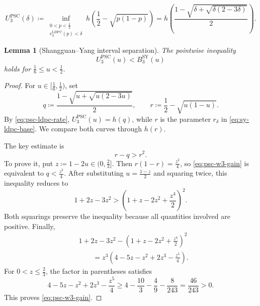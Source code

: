 \documentclass[10pt,a4paper]{amsart}
\newtheorem{lemma}{Lemma}
\newcommand{\PSC}{\mathrm{PSC}}
\renewcommand{\geq}{\geqslant}
\renewcommand{\leq}{\leqslant}
\begin{document}
\begin{equation}
\label{eq:psc-ldpc-rate}
U_3^{\PSC}(\delta)
\coloneqq
\inf_{\substack{0 < p < \frac{1}{2}\\ e_3^{\mathrm{LDPC}}(p) < \delta}}
h\left(\frac{1}{2}-\sqrt{p(1-p)}\right)
=
h\left(\frac{1-\sqrt{\delta+\sqrt{\delta(2-3\delta)}}}{2}\right).
\end{equation}

\begin{lemma}[Shangguan--Yang interval separation]
\label{lem:psc-sy-interval}
The pointwise inequality
\begin{equation*}
U_3^{\PSC}(u)
< B_3^{\mathrm{SY}}(u)
\end{equation*}
holds for $\frac{1}{6} \leq u < \frac{1}{2}$.
\end{lemma}

\begin{proof}
For $u \in [\frac{1}{6},\frac{1}{2})$, set
\begin{equation*}
q
\coloneqq
\frac{1-\sqrt{u+\sqrt{u(2-3u)}}}{2},
\qquad
r
\coloneqq
\frac{1}{2}-\sqrt{u(1-u)}.
\end{equation*}
By \eqref{eq:psc-ldpc-rate}, $U_3^{\PSC}(u) = h(q)$, while $r$ is the parameter $r_\delta$ in \eqref{eq:sy-ldpc-base}. We compare both curves through $h(r)$.

The key estimate is
\begin{equation}
\label{eq:psc-w3-gain}
r-q > r^2.
\end{equation}
To prove it, put $z \coloneqq 1-2u \in (0,\frac{2}{3}]$. Then $r(1-r) = \frac{z^2}{4}$, so \eqref{eq:psc-w3-gain} is equivalent to $q < \frac{z^2}{4}$. After substituting $u = \frac{1-z}{2}$ and squaring twice, this inequality reduces to
\begin{equation*}
1+2z-3z^2
>
\left(1+z-2z^2+\frac{z^4}{2}\right)^2.
\end{equation*}
Both squarings preserve the inequality because all quantities involved are positive. Finally,
\begin{align*}
&1+2z-3z^2
-\left(1+z-2z^2+\frac{z^4}{2}\right)^2\\
&\qquad
=z^3\left(4-5z-z^2+2z^3-\frac{z^5}{4}\right).
\end{align*}
For $0 < z \leq \frac{2}{3}$, the factor in parentheses satisfies
\begin{equation*}
4-5z-z^2+2z^3-\frac{z^5}{4}
\geq
4-\frac{10}{3}-\frac{4}{9}-\frac{8}{243}
= \frac{46}{243} > 0.
\end{equation*}
This proves \eqref{eq:psc-w3-gain}.


\end{proof}
\end{document}
